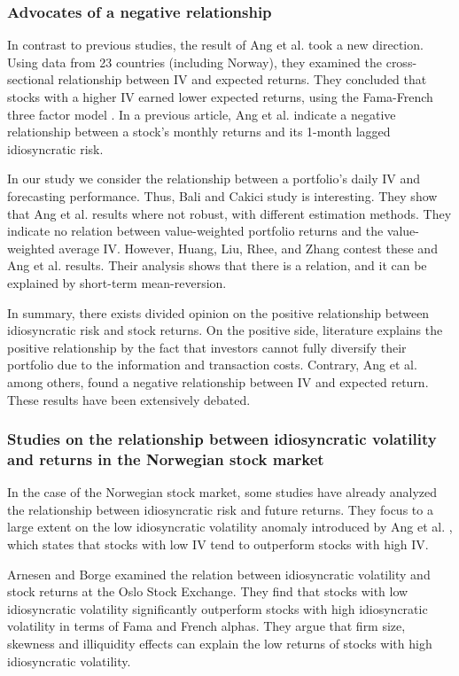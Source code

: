 \subsubsection{Advocates of a negative relationship}
In contrast to previous studies, the result of Ang et al. \cite{angetal09} took a new direction. Using data from 23 countries (including Norway), they examined the cross-sectional relationship between IV and expected returns. They concluded that stocks with a higher IV earned lower expected returns, using the Fama-French three factor model \cite{famafrench}. In a previous article, Ang et al. \cite{angetal06} indicate a negative relationship between a stock's monthly returns and its 1-month lagged idiosyncratic risk. 

In our study we consider the relationship between a portfolio's daily IV and forecasting performance. Thus, Bali and Cakici \cite{balicakici06} study is interesting. They show that Ang et al. \cite{angetal09} results where not robust, with different estimation methods. They indicate no relation between value-weighted portfolio returns and the value-weighted average IV. However, Huang, Liu, Rhee, and Zhang \cite{huang} contest these and Ang et al. \cite{angetal09} results. Their analysis shows that there is a relation, and it can be explained by short-term mean-reversion.

In summary, there exists divided opinion on the positive relationship between idiosyncratic risk and stock returns. On the positive side, literature explains the positive relationship by the fact that investors cannot fully diversify their portfolio due to the information and transaction costs. Contrary, Ang et al. \cite{angetal06} among others, found a negative relationship between IV and expected return. These results have been extensively debated. 

\subsubsection{Studies on the relationship between idiosyncratic volatility and returns in the Norwegian stock market}

In the case of the Norwegian stock market, some studies have already analyzed the relationship between idiosyncratic risk and future returns. They focus to a large extent on the low idiosyncratic volatility anomaly introduced by Ang et al. \cite{angetal06}, which states that stocks with low IV tend to outperform stocks with high IV. 

Arnesen and Borge \cite{arnborge} examined the relation between idiosyncratic volatility and stock returns at the Oslo Stock Exchange. They find that stocks with low idiosyncratic volatility significantly outperform stocks with high idiosyncratic volatility in terms of Fama and French \cite{famafrench} alphas. They argue that firm size, skewness and illiquidity effects can explain the low returns of stocks with high idiosyncratic volatility.

